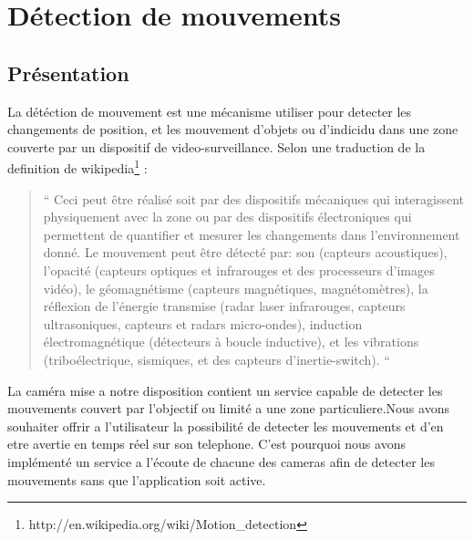\section{Détection de mouvements}
\subsection{Présentation}
La détéction de mouvement est une mécanisme utiliser pour detecter les
changements de position, et les mouvement d'objets ou d'indicidu dans une
zone couverte par un dispositif de video-surveillance.\newline
Selon une traduction de la definition de wikipedia\footnote{\label{MotionDetection}
http://en.wikipedia.org/wiki/Motion\_detection} : \newline
\begin{quotation}
`` Ceci peut être réalisé soit par des dispositifs mécaniques qui interagissent
physiquement avec la zone ou par des dispositifs électroniques qui permettent de
quantifier et mesurer les changements dans l'environnement donné.
Le mouvement peut être détecté par: son (capteurs acoustiques), l'opacité
(capteurs optiques et infrarouges et des processeurs d'images vidéo), le
géomagnétisme (capteurs magnétiques, magnétomètres), la réflexion de l'énergie
transmise (radar laser infrarouges, capteurs ultrasoniques, capteurs et radars
micro-ondes), induction électromagnétique (détecteurs à boucle inductive), et
les vibrations (triboélectrique, sismiques, et des capteurs d'inertie-switch). ``
\end{quotation}
\indent La caméra mise a notre disposition contient un service capable de
detecter les mouvements couvert par l'objectif ou limité a une zone
particuliere.\newline Nous avons souhaiter offrir a l'utilisateur la possibilité
de detecter les mouvements et d'en etre avertie en temps réel sur son telephone.
C'est pourquoi nous avons implémenté un service a l'écoute de chacune des
cameras afin de detecter les mouvements sans que l'application soit active.
